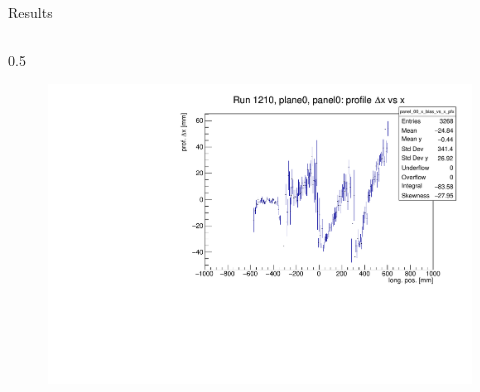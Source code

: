 \documentclass{beamer}[10pt]
\begin{document}
\begin{frame}{Results}
\begin{columns}
\begin{column}{0.5\framewidth}
      \begin{figure}[H]
        \centering
        \includegraphics[width= \textwidth]{figures/pdf/panel_00_x_bias_vs_x_prof.pdf}
        \label{fig:enter-label}
    \end{figure}
    \end{column}
  \end{columns}
\end{frame}
\end{document}
